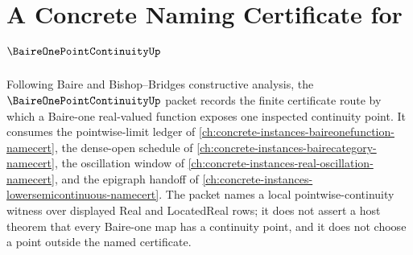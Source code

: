 \chapter{A Concrete Naming Certificate for $\BaireOnePointContinuityUp$}
\label{ch:concrete-instances-baire-one-point-continuity-namecert}

Following Baire and Bishop--Bridges constructive analysis, the $\BaireOnePointContinuityUp$ packet records the finite certificate route by which a Baire-one real-valued function exposes one inspected continuity point. It consumes the pointwise-limit ledger of \autoref{ch:concrete-instances-baireonefunction-namecert}, the dense-open schedule of \autoref{ch:concrete-instances-bairecategory-namecert}, the oscillation window of \autoref{ch:concrete-instances-real-oscillation-namecert}, and the epigraph handoff of \autoref{ch:concrete-instances-lowersemicontinuous-namecert}. The packet names a local pointwise-continuity witness over displayed Real and LocatedReal rows; it does not assert a host theorem that every Baire-one map has a continuity point, and it does not choose a point outside the named certificate.

